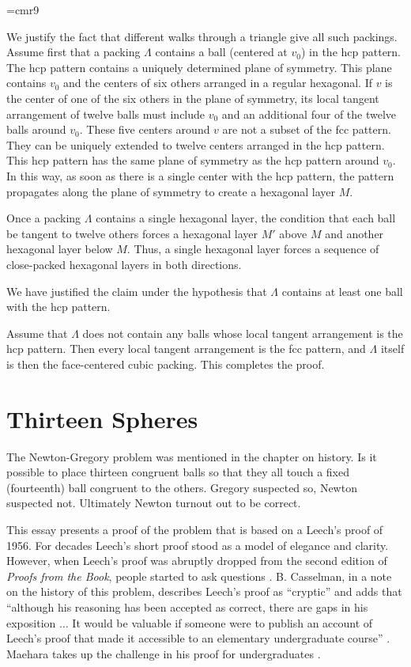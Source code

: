 {

\narrower

\font\ninerm=cmr9 \ninerm



We justify the fact that different walks through a triangle give all
such packings. Assume first that a packing $\Lambda$ contains a ball
(centered at $v_0$) in the hcp pattern. The hcp pattern contains a
uniquely determined plane of symmetry. This plane contains $v_0$ and
the centers of six others arranged in a regular hexagonal. If $v$ is
the center of one of the six others in the plane of symmetry, its
local tangent arrangement of twelve balls must include $v_0$ and an
additional four of the twelve balls around $v_0$. These five centers
around $v$ are not a subset of the fcc pattern. They can be uniquely
extended to twelve centers arranged in the hcp pattern. This hcp
pattern has the same plane of symmetry as the hcp pattern around
$v_0$. In this way, as soon as there is a single center with the hcp
pattern, the pattern propagates along the plane of symmetry to
create a hexagonal layer $M$.

Once a packing $\Lambda$ contains a single hexagonal layer, the
condition that each ball be tangent to twelve others forces a
hexagonal layer $M'$ above $M$ and another hexagonal layer below
$M$.  Thus, a single hexagonal layer forces a sequence of
close-packed hexagonal layers in both directions.

We have justified the claim under the hypothesis that $\Lambda$
contains at least one ball with the hcp pattern.

Assume that $\Lambda$ does not contain any balls whose local
tangent arrangement is the hcp pattern.  Then every local tangent
arrangement is the fcc pattern, and $\Lambda$ itself is then the
face-centered cubic packing.  This completes the proof.


}

\clearpage
\section{Thirteen Spheres}


The Newton-Gregory problem  was mentioned in the chapter on
history.  Is it possible to place thirteen congruent balls so that they
all touch a fixed (fourteenth) ball congruent to the others.
Gregory suspected so, Newton suspected not.  Ultimately Newton turnout
out to be correct.

This essay presents a proof of the problem that is based on a Leech's proof
of 1956.  For decades Leech's short proof stood as a model of elegance and clarity.
However,  when Leech's proof was abruptly dropped from the second
edition of {\it Proofs from the Book}, people started to ask questions \cite{AZ98}.  
B. Casselman, in a note on
the history of this problem, describes Leech's proof as ``cryptic'' and adds 
that ``although his reasoning has been accepted as correct, there are gaps in his
exposition $\ldots$  It would be valuable if someone were to publish an account
of Leech's proof that made it accessible to an elementary undergraduate course'' \cite{BC04}.
Maehara takes up the challenge in his proof for undergraduates \cite{Mae07}.

